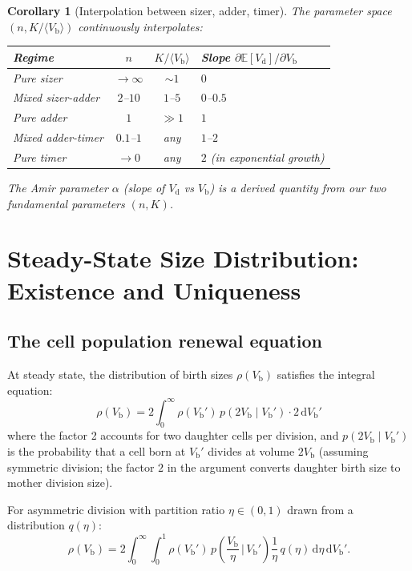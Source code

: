 \documentclass[11pt]{article}
\newcommand{\Vb}{V_{\mathrm{b}}}
\newcommand{\Vd}{V_{\mathrm{d}}}
\newcommand{\E}{\mathbb{E}}
\newcommand{\dd}{\mathrm{d}}
\newtheorem{corollary}{Corollary}
\begin{document}
\begin{corollary}[Interpolation between sizer, adder, timer]
The parameter space $(n, K/\langle\Vb\rangle)$ continuously interpolates:
\begin{center}
\begin{tabular}{lccl}
\hline
\textbf{Regime} & $n$ & $K/\langle\Vb\rangle$ & \textbf{Slope $\partial\E[\Vd]/\partial\Vb$} \\
\hline
Pure sizer & $\to\infty$ & $\sim 1$ & $0$ \\
Mixed sizer-adder & $2$--$10$ & $1$--$5$ & $0$--$0.5$ \\
Pure adder & $1$ & $\gg 1$ & $1$ \\
Mixed adder-timer & $0.1$--$1$ & any & $1$--$2$ \\
Pure timer & $\to 0$ & any & $2$ (in exponential growth) \\
\hline
\end{tabular}
\end{center}
The Amir parameter $\alpha$ (slope of $\Vd$ vs $\Vb$) is a \emph{derived quantity} from our two fundamental parameters $(n, K)$.
\end{corollary}

\section{Steady-State Size Distribution: Existence and Uniqueness}

\subsection{The cell population renewal equation}

At steady state, the distribution of birth sizes $\rho(\Vb)$ satisfies the integral equation:
\begin{equation}
  \rho(\Vb) = 2\int_0^{\infty} \rho(\Vb')\, p(2\Vb \mid \Vb')\cdot 2\, \dd\Vb'
  \label{eq:renewal}
\end{equation}
where the factor 2 accounts for two daughter cells per division, and $p(2\Vb \mid \Vb')$ is the probability that a cell born at $\Vb'$ divides at volume $2\Vb$ (assuming symmetric division; the factor $2$ in the argument converts daughter birth size to mother division size).

For asymmetric division with partition ratio $\eta \in (0,1)$ drawn from a distribution $q(\eta)$:
\begin{equation}
  \rho(\Vb) = 2\int_0^{\infty}\!\!\int_0^1 \rho(\Vb')\, p\!\left(\frac{\Vb}{\eta}\,\Big|\, \Vb'\right)\frac{1}{\eta}\, q(\eta)\, \dd\eta\, \dd\Vb'.
  \label{eq:renewal_asym}
\end{equation}
\end{document}
